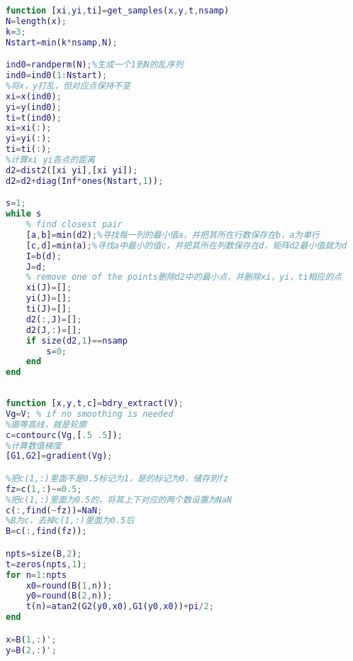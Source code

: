 \begin{lstlisting}[caption=Jitendra采样法,language=matlab]
function [xi,yi,ti]=get_samples(x,y,t,nsamp)
N=length(x);
k=3;
Nstart=min(k*nsamp,N);

ind0=randperm(N);%生成一个1到N的乱序列
ind0=ind0(1:Nstart);
%将x，y打乱，但对应点保持不变
xi=x(ind0);
yi=y(ind0);
ti=t(ind0);
xi=xi(:);
yi=yi(:);
ti=ti(:);
%计算xi yi各点的距离
d2=dist2([xi yi],[xi yi]);
d2=d2+diag(Inf*ones(Nstart,1));

s=1;
while s
    % find closest pair
    [a,b]=min(d2);%寻找每一列的最小值a，并把其所在行数保存在b，a为单行
    [c,d]=min(a);%寻找a中最小的值c，并把其所在列数保存在d，矩阵d2最小值就为d
    I=b(d);
    J=d;
    % remove one of the points删除d2中的最小点，并删除xi，yi，ti相应的点
    xi(J)=[];
    yi(J)=[];
    ti(J)=[];
    d2(:,J)=[];
    d2(J,:)=[];
    if size(d2,1)==nsamp
        s=0;
    end
end
      
\end{lstlisting}

\begin{lstlisting}[caption=利用梯度来提取边缘,language=matlab]
function [x,y,t,c]=bdry_extract(V);
Vg=V; % if no smoothing is needed
%画等高线，就是轮廓
c=contourc(Vg,[.5 .5]);
%计算数值梯度
[G1,G2]=gradient(Vg);

%把c(1,:)里面不是0.5标记为1，是的标记为0，储存到fz
fz=c(1,:)~=0.5;
%把c(1,:)里面为0.5的，将其上下对应的两个数设置为NaN
c(:,find(~fz))=NaN;
%B为c，去掉c(1,:)里面为0.5后
B=c(:,find(fz));

npts=size(B,2);
t=zeros(npts,1);
for n=1:npts
    x0=round(B(1,n));
    y0=round(B(2,n));
    t(n)=atan2(G2(y0,x0),G1(y0,x0))+pi/2;
end

x=B(1,:)';
y=B(2,:)';

\end{lstlisting}

